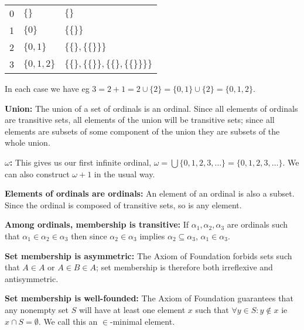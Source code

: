 \documentclass{article}
\begin{document}
\begin{tabular}{ l l l }
0 & $\{\}$ & $\{\}$ \\
1 & $\{0\}$ & $\{\{\}\}$ \\
2 & $\{0, 1\}$ & $\{\{\}, \{\{\}\}\}$ \\
3 & $\{0, 1, 2\}$ & $\{\{\}, \{\{\}\}, \{\{\}, \{\{\}\}\}\}$ \\
\end{tabular}

In each case we have eg $3 = 2 + 1 = 2 \cup \{2\} = \{0, 1\} \cup \{2\} = \{0, 1, 2\}$.

\textbf{Union:} The union of a set of ordinals is an ordinal. Since all elements of ordinals are transitive sets, all elements of the union will be transitive sets; since all elements are subsets of some component of the union they are subsets of the whole union.

\textbf{$\omega$:} This gives us our first infinite ordinal, $\omega = \bigcup\{0, 1, 2, 3, \ldots\} =  \{0, 1, 2, 3, \ldots\}$. We can also construct $\omega + 1$ in the usual way.

\textbf{Elements of ordinals are ordinals:} An element of an ordinal is also a subset. Since the ordinal is composed of transitive sets, so is any element.

\textbf{Among ordinals, membership is transitive:} If $\alpha_1, \alpha_2, \alpha_3$ are ordinals such that $\alpha_1 \in \alpha_2 \in \alpha_3$ then  since $\alpha_2 \in \alpha_3$ implies $\alpha_2 \subseteq \alpha_3$, $\alpha_1 \in \alpha_3$.

\textbf{Set membership is asymmetric:} The Axiom of Foundation forbids sets such that $A \in A$ or $A \in B \in A$; set membership is therefore both irreflexive and antisymmetric.

\textbf{Set membership is well-founded:} The Axiom of Foundation guarantees that any nonempty set $S$ will have at least one element $x$ such that $\forall y \in S: y \not\in x$ ie $x \cap S = \emptyset$. We call this an $\in$-minimal element.
\end{document}
